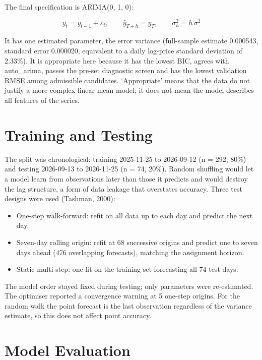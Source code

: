 \documentclass[11pt,a4paper]{article}
\begin{document}
The final specification is ARIMA(0, 1, 0):

\begin{equation}
y_t=y_{t-1}+\varepsilon_t,\qquad \hat y_{T+h}=y_T,\qquad \sigma_h^2=h\,\sigma^2
\end{equation}

It has one estimated parameter, the error variance (full-sample estimate 0.000543, standard error 0.000020, equivalent to a daily log-price standard deviation of 2.33\%). It is appropriate here because it has the lowest BIC, agrees with auto\_arima, passes the pre-set diagnostic screen and has the lowest validation RMSE among admissible candidates. `Appropriate' means that the data do not justify a more complex linear mean model; it does not mean the model describes all features of the series.

\section{Training and Testing}

The split was chronological: training 2025-11-25 to 2026-09-12 (n = 292, 80\%) and testing 2026-09-13 to 2026-11-25 (n = 74, 20\%). Random shuffling would let a model learn from observations later than those it predicts and would destroy the lag structure, a form of data leakage that overstates accuracy. Three test designs were used (Tashman, 2000):

\begin{itemize}
  \item One-step walk-forward: refit on all data up to each day and predict the next day.
  \item Seven-day rolling origin: refit at 68 successive origins and predict one to seven days ahead (476 overlapping forecasts), matching the assignment horizon.
  \item Static multi-step: one fit on the training set forecasting all 74 test days.
\end{itemize}

The model order stayed fixed during testing; only parameters were re-estimated. The optimiser reported a convergence warning at 5 one-step origins. For the random walk the point forecast is the last observation regardless of the variance estimate, so this does not affect point accuracy.

\section{Model Evaluation}
\end{document}
